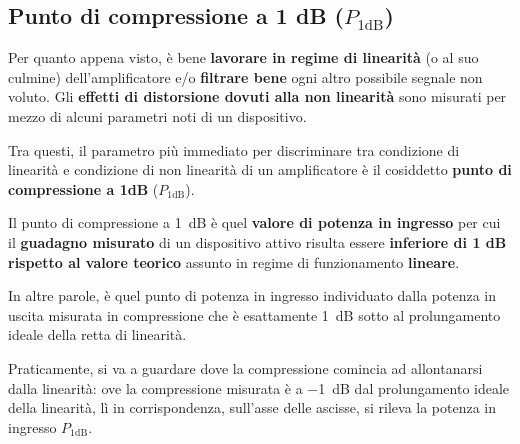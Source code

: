 \documentclass[openany,a4paper,12pt]{book}
\begin{document}
\begin{figure}[H]
{%
    }
\end{figure}

\subsection*{Punto di compressione a 1 dB ($P_{1\text{dB}}$)}

Per quanto appena visto, è bene \textbf{lavorare in regime di linearità} (o al suo culmine) dell'amplificatore e/o \textbf{filtrare bene} ogni altro possibile segnale non voluto. Gli \textbf{effetti di distorsione dovuti alla non linearità} sono misurati per mezzo di alcuni parametri noti di un dispositivo. 

Tra questi, il parametro più immediato per discriminare tra condizione di linearità e condizione di non linearità di un amplificatore è il cosiddetto \textbf{punto di compressione a 1dB} ($P_{1\text{dB}}$).

\begin{definizione}[title={\textbf{Definizione di $P_{1\text{dB}}$}}]
    Il punto di compressione a \qty{1}{\deci\bel} è quel \textbf{valore di potenza in ingresso} per cui il \textbf{guadagno misurato} di un dispositivo attivo risulta essere \textbf{inferiore di 1 dB rispetto al valore teorico} assunto in regime di funzionamento \textbf{lineare}. 
    
    In altre parole, è quel punto di potenza in ingresso individuato dalla potenza in uscita misurata in compressione che è esattamente \qty{1}{\deci\bel} sotto al prolungamento ideale della retta di linearità.
\end{definizione}

Praticamente, si va a guardare dove la compressione comincia ad allontanarsi dalla linearità: ove la compressione misurata è a \qty{-1}{\deci\bel} dal prolungamento ideale della linearità, lì in corrispondenza, sull'asse delle ascisse, si rileva la potenza in ingresso $P_{1\text{dB}}$.
\end{document}
